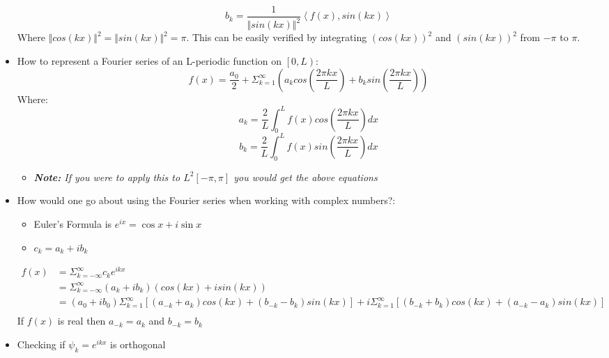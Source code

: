 \documentclass[11.5pt,a4paper]{article}
\begin{document}
\begin{itemize}
\begin{equation*}
    \end{equation*}
    \begin{equation*}
        b_k = \frac{1}{\Vert sin(kx) \Vert^2}\left<f(x), sin(kx)\right>
    \end{equation*}
    Where $\Vert cos(kx) \Vert^2 = \Vert sin(kx) \Vert^2 = \pi$. This can be easily verified by integrating $(cos(kx))^2$ and $(sin(kx))^2$ from $-\pi$ to $\pi$.
    \item How to represent a Fourier series of an L-periodic function on $\left[0, L\right)$:
    \begin{equation*}
        f(x) = \frac{a_0}{2} + \Sigma^\infty_{k=1}\left(a_k cos\left(\frac{2\pi kx}{L} \right) + b_k sin\left(\frac{2\pi kx}{L} \right)\right)
    \end{equation*}
    Where:
    \begin{equation*}
        a_k = \frac{2}{L}\int^L_{0}f(x)cos\left(\frac{2\pi kx}{L}\right) dx
    \end{equation*}
    \begin{equation*}
        b_k = \frac{2}{L}\int^L_{0}f(x)sin\left(\frac{2\pi kx}{L}\right) dx
    \end{equation*}
    \begin{itemize}
        \item \textit{\textbf{Note:} If you were to apply this to $L^2[-\pi, \pi]$ you would get the above equations}
    \end{itemize}
    \item How would one go about using the Fourier series when working with complex numbers?:
    \begin{itemize}
        \item Euler's Formula is $e^{ix} = \cos x + i \sin x$
        \item $c_k = a_k + ib_k$
    \end{itemize}
    \begin{align*}
        f(x) &= \Sigma^{\infty}_{k=-\infty}c_ke^{ikx} \\
        &= \Sigma^{\infty}_{k=-\infty} (a_k + ib_k)(cos(kx) + isin(kx))\\
        &=(a_0 + ib_0)\Sigma^{\infty}_{k=1} \left[ (a_{-k} + a_k)cos(kx) +(b_{-k} - b_k)sin(kx) \right] + i\Sigma^{\infty}_{k=1}  \left[ (b_{-k} + b_k)cos(kx) +(a_{-k} - a_k)sin(kx) \right]\\
    \end{align*}
    If $f(x)$ is real then $a_{-k} = a_k$ and $b_{-k} = b_k$
    \item Checking if $\psi_k = e^{ikx}$ is orthogonal

\end{itemize}
\end{document}
